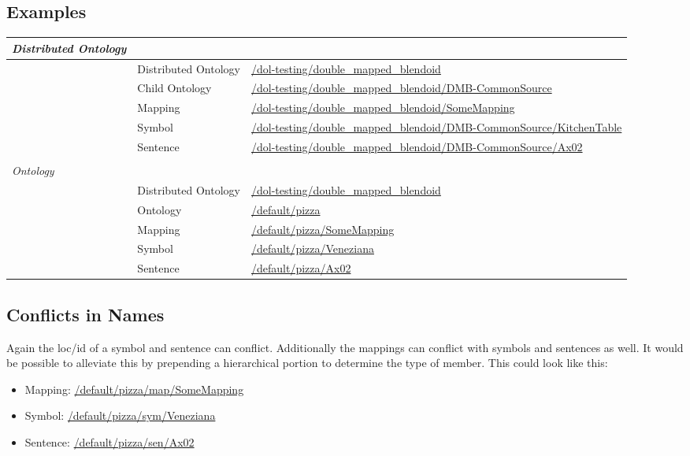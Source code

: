 \documentclass[a4paper,11pt,DIV=25]{scrartcl}
\begin{document}
\subsection{Examples}

\begin{tabularx}{\textwidth}{p{}p{}p{}}
  \textit{Distributed Ontology} & & \\
  \hline
  & Distributed Ontology & \url{/dol-testing/double_mapped_blendoid}\\
  & Child Ontology & \url{/dol-testing/double_mapped_blendoid/DMB-CommonSource}\\
  & Mapping & \url{/dol-testing/double_mapped_blendoid/SomeMapping}\\
  & Symbol & \url{/dol-testing/double_mapped_blendoid/DMB-CommonSource/KitchenTable}\\
  & Sentence & \url{/dol-testing/double_mapped_blendoid/DMB-CommonSource/Ax02}\\
  & & \\
  \textit{Ontology} & & \\
  \hline
  & Distributed Ontology & \url{/dol-testing/double_mapped_blendoid}\\
  & Ontology & \url{/default/pizza}\\
  & Mapping & \url{/default/pizza/SomeMapping}\\
  & Symbol & \url{/default/pizza/Veneziana}\\
  & Sentence & \url{/default/pizza/Ax02}\\
\end{tabularx}

\subsection{Conflicts in Names}

Again the loc/id of a symbol and sentence can conflict. Additionally the
mappings can conflict with symbols and sentences as well. It would be possible
to alleviate this by prepending a hierarchical portion to determine the type of
member. This could look like this:

\begin{itemize}
  \item Mapping: \url{/default/pizza/map/SomeMapping}
  \item Symbol: \url{/default/pizza/sym/Veneziana}
  \item Sentence: \url{/default/pizza/sen/Ax02}
\end{itemize}
\end{document}

